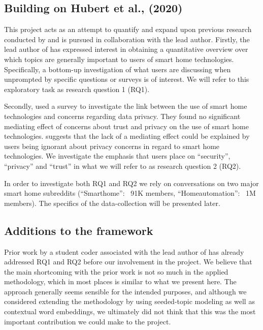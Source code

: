 \documentclass{article}
\begin{document}
    \subsection{Building on Hubert et al., (2020)}
    This project acts as an attempt to quantify and expand upon previous research conducted by  and is pursued in collaboration with the lead author. Firstly, the lead author of  has expressed interest in obtaining a quantitative overview over which topics are generally important to users of smart home technologies. Specifically, a bottom-up investigation of what users are discussing when unprompted by specific questions or surveys is of interest. We will refer to this exploratory task as research question 1 (RQ1). 

Secondly,  used a survey to investigate the link between the use of smart home technologies and concerns regarding data privacy. They found no significant mediating effect of concerns about trust and privacy on the use of smart home technologies.  suggests that the lack of a mediating effect could be explained by users being ignorant about privacy concerns in regard to smart home technologies. We investigate the emphasis that users place on “security”, “privacy” and “trust” in what we will refer to as research question 2 (RQ2). 

In order to investigate both RQ1 and RQ2 we rely on conversations on two major smart home subreddits (“Smarthome”: ~91K members, “Homeautomation”: ~1M members). The specifics of the data-collection will be presented later. 

    \subsection{Additions to the framework}
    Prior work by a student coder associated with the lead author of  has already addressed RQ1 and RQ2 before our involvement in the project. We believe that the main shortcoming with the prior work is not so much in the applied methodology, which in most places is similar to what we present here. The approach generally seems sensible for the intended purposes, and although we considered extending the methodology by using seeded-topic modeling as well as contextual word embeddings, we ultimately did not think that this was the most important contribution we could make to the project. 
\end{document}
